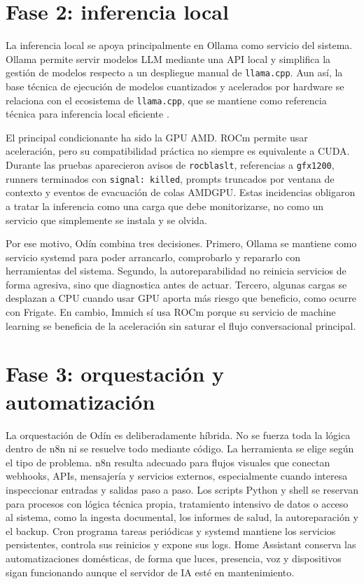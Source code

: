 \section{Fase 2: inferencia local}
La inferencia local se apoya principalmente en Ollama como servicio del sistema. Ollama permite servir modelos LLM mediante una API local y simplifica la gestión de modelos respecto a un despliegue manual de \texttt{llama.cpp}. Aun así, la base técnica de ejecución de modelos cuantizados y acelerados por hardware se relaciona con el ecosistema de \texttt{llama.cpp}, que se mantiene como referencia técnica para inferencia local eficiente \citep{ollamaDocs,llamacppRepo}.

El principal condicionante ha sido la GPU AMD. ROCm permite usar aceleración, pero su compatibilidad práctica no siempre es equivalente a CUDA. Durante las pruebas aparecieron avisos de \texttt{rocblaslt}, referencias a \texttt{gfx1200}, runners terminados con \texttt{signal: killed}, prompts truncados por ventana de contexto y eventos de evacuación de colas AMDGPU. Estas incidencias obligaron a tratar la inferencia como una carga que debe monitorizarse, no como un servicio que simplemente se instala y se olvida.

Por ese motivo, Odín combina tres decisiones. Primero, Ollama se mantiene como servicio systemd para poder arrancarlo, comprobarlo y repararlo con herramientas del sistema. Segundo, la autoreparabilidad no reinicia servicios de forma agresiva, sino que diagnostica antes de actuar. Tercero, algunas cargas se desplazan a CPU cuando usar GPU aporta más riesgo que beneficio, como ocurre con Frigate. En cambio, Immich sí usa ROCm porque su servicio de machine learning se beneficia de la aceleración sin saturar el flujo conversacional principal.

\section{Fase 3: orquestación y automatización}
La orquestación de Odín es deliberadamente híbrida. No se fuerza toda la lógica dentro de n8n ni se resuelve todo mediante código. La herramienta se elige según el tipo de problema. n8n resulta adecuado para flujos visuales que conectan webhooks, APIs, mensajería y servicios externos, especialmente cuando interesa inspeccionar entradas y salidas paso a paso. Los scripts Python y shell se reservan para procesos con lógica técnica propia, tratamiento intensivo de datos o acceso al sistema, como la ingesta documental, los informes de salud, la autoreparación y el backup. Cron programa tareas periódicas y systemd mantiene los servicios persistentes, controla sus reinicios y expone sus logs. Home Assistant conserva las automatizaciones domésticas, de forma que luces, presencia, voz y dispositivos sigan funcionando aunque el servidor de IA esté en mantenimiento.

